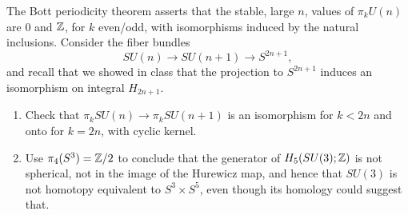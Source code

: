 \documentclass[12pt]{article}
\begin{document}
\begin{problem}[3]
The Bott periodicity theorem asserts that the stable, large $n$, values of $\pi_k U(n)$ are $0$ and $\mathbb{Z}$, for $k$ even/odd, with isomorphisms induced by the natural inclusions. Consider the fiber bundles
\[
SU(n)\longrightarrow SU(n+1)\longrightarrow S^{2n+1},
\]
and recall that we showed in class that the projection to $S^{2n+1}$ induces an isomorphism on integral $H_{2n+1}$.

\begin{enumerate}
    \item Check that $\pi_k SU(n)\to \pi_k SU(n+1)$ is an isomorphism for $k<2n$ and onto for $k=2n$, with cyclic kernel.
    \item Use $\pi_4(S^3)=\mathbb{Z}/2$ to conclude that the generator of $H_5(SU(3);\mathbb{Z})$ is not spherical, not in the image of the Hurewicz map, and hence that $SU(3)$ is not homotopy equivalent to $S^3\times S^5$, even though its homology could suggest that.
\end{enumerate}
\end{problem}
\end{document}

